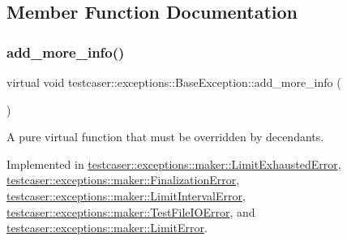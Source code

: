 \subsection{Member Function Documentation}
\mbox{\label{classtestcaser_1_1exceptions_1_1BaseException_ad607ea04e2cb4ad9b8d0e2e6b6734f2f}} 
\subsubsection{\texorpdfstring{add\_more\_info()}{add\_more\_info()}}
{\footnotesize\ttfamily virtual void testcaser\+::exceptions\+::\+Base\+Exception\+::add\+\_\+more\+\_\+info (\begin{DoxyParamCaption}{ }\end{DoxyParamCaption})\hspace{0.3cm}{\ttfamily [pure virtual]}}



A pure virtual function that must be overridden by decendants. 



Implemented in \mbox{\hyperlink{classtestcaser_1_1exceptions_1_1maker_1_1LimitExhaustedError_a40beeee091c1d5a35a12d6ab974c0895}{testcaser\+::exceptions\+::maker\+::\+Limit\+Exhausted\+Error}}, \mbox{\hyperlink{classtestcaser_1_1exceptions_1_1maker_1_1FinalizationError_a2e0aee4c53427abcbbcf3d5704687d76}{testcaser\+::exceptions\+::maker\+::\+Finalization\+Error}}, \mbox{\hyperlink{classtestcaser_1_1exceptions_1_1maker_1_1LimitIntervalError_a6a050ee23517e8dcb6477011b4a5e406}{testcaser\+::exceptions\+::maker\+::\+Limit\+Interval\+Error}}, \mbox{\hyperlink{classtestcaser_1_1exceptions_1_1maker_1_1TestFileIOError_ab83e748d26f860c9b045535447a383c5}{testcaser\+::exceptions\+::maker\+::\+Test\+File\+I\+O\+Error}}, and \mbox{\hyperlink{classtestcaser_1_1exceptions_1_1maker_1_1LimitError_adb0f0c92f0d78b26f4310301f97bff3a}{testcaser\+::exceptions\+::maker\+::\+Limit\+Error}}.

\mbox{\label{classtestcaser_1_1exceptions_1_1BaseException_a92c371d40b0f3dbaa7de968ea67e5211}} 
